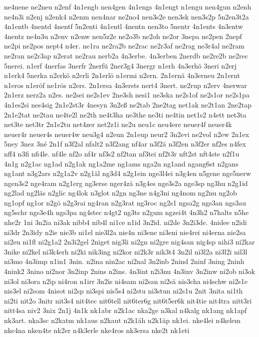 {ne4nene
ne2neu
n2enf
4n1engb
nen4gen
4n1engs
4n1engt
n1engu
nen4gun
n2enh
ne4n3i
n2enj
n2enk4
n2enm
nen4nar
ne2no4
nen3s2e
nen3sk
nen3s2p
5n2en3t2a
4n1entb
4nentd
4nentf
5n2enti
4n1entl
4nentn
nen3to
5nentr
4n1ents
4n3entw
4nentz
ne4n3u
n2env
n2enw
nen5z2e
ne2o3b
ne2oh
ne2or
3nepa
ne2pen
2nepf
ne2pi
ne2pos
nept4
n4er.
ne1ra
ne2ra2b
ne2rac
ne2r3af
ne2rag
ne3r4al
ne2ram
ne2ran
ne2r3ap
n2erat
ne2rau
nerb2a
4n3erbe.
4n3erben
2nerdb
ne2re2b
ne2rec
5nerei.
n1erf
4nerfas
3nerfr
2nerfü
2ner3g4
3nergr
n1erh
4n3erhö
3neri
n2erj
n1erk4
5nerka
n2erkö
n2erli
2n1erlö
n1ermi
n2ern.
2n1ernä
4n3erneu
2n1ernt
n1eros
n1eröf
ne1rös
n2ers.
2n1ersa
4n3ersts
nert4
3nert.
ne2rup
n2erv
4nerwar
2n1erz
nerz2a
n2es.
ne2sei
ne2s1ev
2ne3sh
nesi1
ne3ska
ne2s1of
ne2s1or
ne2s1pa
4n1es2si
nes4sig
2n1e2st3r
4nesyn
3n2eß
ne2tab
2ne2tag
net1ak
ne2t1an
2ne2tap
2n1e2tat
ne2tau
ne4te2l
ne2th
ne4t3ha
ne3the
ne3ti
ne4tin
net1s2
n4ett
net3ta
net3te
net3tr
2n1e2tu
net4zer
net2z1i
ne2u
neu1c
neu4ere
neuer4f
neuer4k
neuer4r
neuer4s
neuer4w
neu3g4
n2eun
2n1eup
neur2
3n2evi
ne2vol
n2ew
2n1ex
5ney
3nez
3né
2n1f
n3f2al
nfalt2
n3f2ang
nf4ar
n3f2ä
n3f2en
n3f2er
nf2es
n4fex
nff4
n3fi
nfi4le.
nf4le
nf2o
nf4r
nf3s2
nf2tan
nf3tei
nf2t3r
nft2st
nft4ste
n2f1u
4n1g
n2g1ac
ng1ad
n2g1ak
ng1a2me
ng1ams
nga2n
ng1and
ngang6st
n2gans
ng1ant
n3g2ars
n2g1a2v
n2g1äl
ng3d4
n2g1ein
nge3l4ei
n3g4en
n5gene
nge5nerw
ngen3s2
nge4ram
n2g1erg
ng3erse
nger4zä
n3g4es
nge3s2a
nge3sp
ng3hu
n2g1id
ng2lad
ng2läs
n2glic
ng4lok
n3glot
n2gn
ng3ne
n4g3ni
ng4nom
ng2nu
ng2ob
ng1opf
ng1or
n2gö
n2g3rai
ng4ran
n2g3rat
ng3roc
ng2s1
ngsa2g
ngs3an
ngs3au
ng5schr
ngs3e4h
ngs3pa
ng4stec
n4gt2
ng3ts
n2gum
ngzei4t
4n3h2
n7halts
n5he
nhe2r
1ni
3n2ia
ni3ak
nibb4
nib4l
ni1ce
n1id
3n2id.
ni2de
3n2i3de.
4nidee
n2idi
ni3dr
2n3idy
n2ie
nie3b
ni1el
nie3l2a
nie4n
ni3ene
ni3eni
nie4rei
ni4erna
nie2sa
ni2eu
ni1fl
ni2g1a2
2n3i2gel
2niget
nig3li
ni2gn
ni2gre
nig4san
nig4sp
nihi3
ni2kar
3nike
ni2kel
ni3k4erh
ni2ki
nik3ing
ni2kor
ni2k3r
nik3t4
3n2il
ni3l2a
ni3l2i
nil3l
ni3mo
4n3imp
n1in1
3nin.
n2ina
nin2ac
ni2nal
3n2inb
2nind
2ninf
3ning
2ninh
4nink2
3nino
ni2nor
3n2inp
2nins
n2ins.
4n3int
n2i3nu
4n3inv
3n2inw
ni2ob
ni3ok
ni3ol
ni3ora
n2ip
ni4ron
n1irr
3n2is
ni4sam
ni2san
ni2sä
nis3cha
ni4schw
ni2s1e
nis3el
ni2som
4nisot
ni2sp
ni3spi
nis5s4
ni2stu
ni3stun
ni2s1u
2nit
3nita
ni1th
ni2ti
nit2o
3nitr
nit3s4
nit4tec
nit6tell
nit6ter6g
nit6t5er6k
nit4tie
nit4tra
nitt3ri
nitt4sa
niv2
3nix
2n1j
4n1k
nk1abr
n2k1ac
nka2ge
n3kal
n4kalg
nk1ang
nk1apf
nk3art.
nka3sc
n2katm
nk1aus
n2kaut
n2k1äh
n2k1äp
nk1ei.
nke4lei
n4kelem
nke4na
nken4te
nk2er
n4k3erle
nke4ros
nk3ersa
nke2t
nk1eti
}
